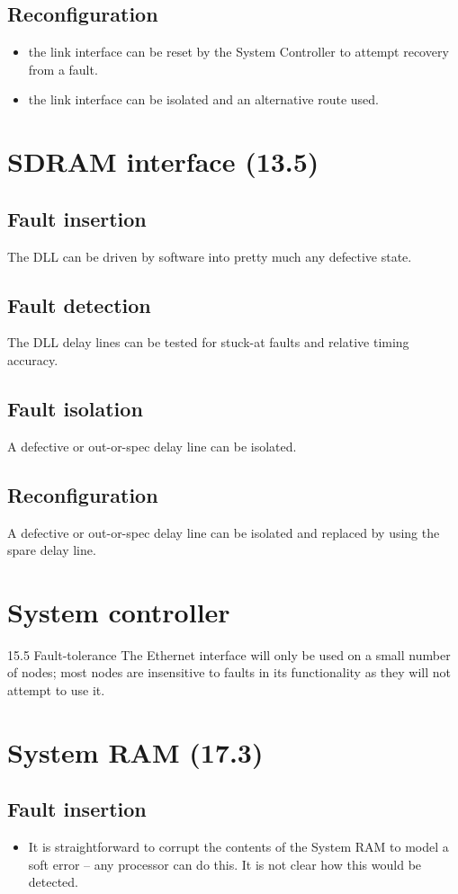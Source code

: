 \documentclass[oneside, a4paper, 11pt]{memoir}
\newenvironment{itmz}{
	\begin{itemize}
		\setlength{\itemsep}{0pt}
		\setlength{\parskip}{0pt}
	}{\end{itemize}}
\begin{document}
\subsection*{Reconfiguration}
\begin{itmz}
\item the link interface can be reset by the System Controller to attempt recovery from a fault.
\item the link interface can be isolated and an alternative route used.
\end{itmz}

\section{SDRAM interface (13.5)}
\subsection*{Fault insertion}
The DLL can be driven by software into pretty much any defective state.
\subsection*{Fault detection}
The DLL delay lines can be tested for stuck-at faults and relative timing accuracy.
\subsection*{Fault isolation}
A defective or out-or-spec delay line can be isolated.
\subsection*{Reconfiguration}
A defective or out-or-spec delay line can be isolated and replaced by using the spare delay line.

\section{System controller}
15.5 Fault-tolerance
The Ethernet interface will only be used on a small number of nodes; most nodes are insensitive to
faults in its functionality as they will not attempt to use it.

\section{System RAM (17.3)}
\subsection*{Fault insertion}
\begin{itmz}
\item It is straightforward to corrupt the contents of the System RAM to model a soft error -- any processor can do this. It is not clear how this would be detected.
\end{itmz}
\end{document}

